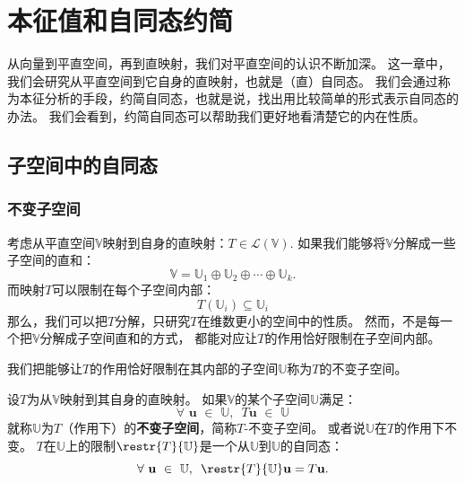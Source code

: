 \documentclass[12pt,UTF8,fontset=none]{ctexbook}
\begin{document}
\chapter{本征值和自同态约简}
从向量到平直空间，再到直映射，我们对平直空间的认识不断加深。
这一章中，我们会研究从平直空间到它自身的直映射，也就是（直）自同态。
我们会通过称为本征分析的手段，约简自同态，也就是说，找出用比较简单的形式表示自同态的办法。
我们会看到，约简自同态可以帮助我们更好地看清楚它的内在性质。

\begin{center}
\end{center}

\section{子空间中的自同态}
\subsection{不变子空间}
考虑从平直空间$\mathbb{V}$映射到自身的直映射：$T \in \mathcal{L}(\mathbb{V})$. 
如果我们能够将$\mathbb{V}$分解成一些子空间的直和：
$$ \mathbb{V} = \mathbb{U}_1 \oplus \mathbb{U}_2 \oplus \cdots \oplus \mathbb{U}_k. $$
而映射$T$可以限制在每个子空间内部：
$$ T(\mathbb{U}_i) \subseteq \mathbb{U}_i$$
那么，我们可以把$T$分解，只研究$T$在维数更小的空间中的性质。
然而，不是每一个把$\mathbb{V}$分解成子空间直和的方式，
都能对应让$T$的作用恰好限制在子空间内部。

我们把能够让$T$的作用恰好限制在其内部的子空间$\mathbb{U}$称为$T$的不变子空间。

\begin{df}\label{df:6_1}
    设$T$为从$\mathbb{V}$映射到其自身的直映射。
    如果$\mathbb{V}$的某个子空间$\mathbb{U}$满足： 
    $$ \forall \,\, \mathbf{u} \,\, \in \,\, \mathbb{U}, \,\,\, T\mathbf{u} \,\, \in \,\, \mathbb{U} $$
    就称$\mathbb{U}$为$T$（作用下）的\textbf{不变子空间}，简称$T$-不变子空间。
    或者说$\mathbb{U}$在$T$的作用下不变。
    $T$在$\mathbb{U}$上的限制$\restr{T}{\mathbb{U}}$是一个从$\mathbb{U}$到$\mathbb{U}$的自同态：
    $$ \forall \,\, \mathbf{u} \,\, \in \,\, \mathbb{U}, \,\,\, \restr{T}{\mathbb{U}}\mathbf{u} = T\mathbf{u}. $$
\end{df}
\end{document}
